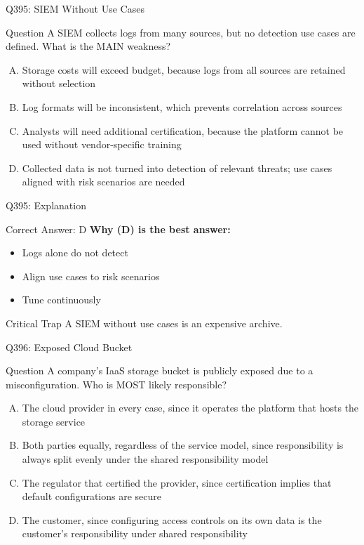 \documentclass{beamer}
\begin{document}
	\begin{frame}{Q395: SIEM Without Use Cases}
		\begin{block}{Question}
			\small A SIEM collects logs from many sources, but no detection use cases are defined. What is the MAIN weakness?
		\end{block}
		\begin{enumerate}[(A)]
			\footnotesize
			\item Storage costs will exceed budget, because logs from all sources are retained without selection
			\item Log formats will be inconsistent, which prevents correlation across sources
			\item Analysts will need additional certification, because the platform cannot be used without vendor-specific training
			\item Collected data is not turned into detection of relevant threats; use cases aligned with risk scenarios are needed
		\end{enumerate}
	\end{frame}
	
	\begin{frame}{Q395: Explanation}
		\begin{block}{Correct Answer: D}
			\textbf{Why (D) is the best answer:}
			\begin{itemize}
				\item Logs alone do not detect
				\item Align use cases to risk scenarios
				\item Tune continuously
			\end{itemize}
		\end{block}
		\begin{alertblock}{Critical Trap}
			A SIEM without use cases is an expensive archive.
		\end{alertblock}
	\end{frame}
	
	\begin{frame}{Q396: Exposed Cloud Bucket}
		\begin{block}{Question}
			\small A company's IaaS storage bucket is publicly exposed due to a misconfiguration. Who is MOST likely responsible?
		\end{block}
		\begin{enumerate}[(A)]
			\footnotesize
			\item The cloud provider in every case, since it operates the platform that hosts the storage service
			\item Both parties equally, regardless of the service model, since responsibility is always split evenly under the shared responsibility model
			\item The regulator that certified the provider, since certification implies that default configurations are secure
			\item The customer, since configuring access controls on its own data is the customer's responsibility under shared responsibility
		\end{enumerate}
	\end{frame}
	
\end{document}
